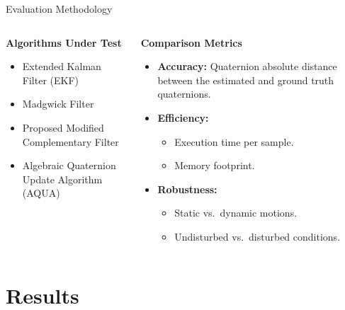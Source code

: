 \documentclass[aspectratio=169,xcolor=dvipsnames]{beamer}
\begin{document}
  \begin{frame}{Evaluation Methodology}
    \scriptsize
    \begin{columns}[T]
      \begin{column}{0.48\textwidth}
        \textbf{Algorithms Under Test}
        \begin{itemize}
          \item Extended Kalman Filter (EKF)
          \item Madgwick Filter
          \item Proposed Modified Complementary Filter
          \item Algebraic Quaternion Update Algorithm (AQUA)
        \end{itemize}
      \end{column}
    
      \begin{column}{0.48\textwidth}
        \textbf{Comparison Metrics}
        \begin{itemize}
          \item \textbf{Accuracy:} Quaternion absolute distance between the estimated and ground truth quaternions.
          \item \textbf{Efficiency:}
            \begin{itemize}
              \item Execution time per sample.
              \item Memory footprint.
            \end{itemize}
          \item \textbf{Robustness:}
            \begin{itemize}
              \item Static vs.\ dynamic motions.
              \item Undisturbed vs.\ disturbed conditions.
            \end{itemize}
        \end{itemize}
        \vspace{0.5em}
      \end{column}
    \end{columns}
    \end{frame}
  


\section{Results}
\end{document}
